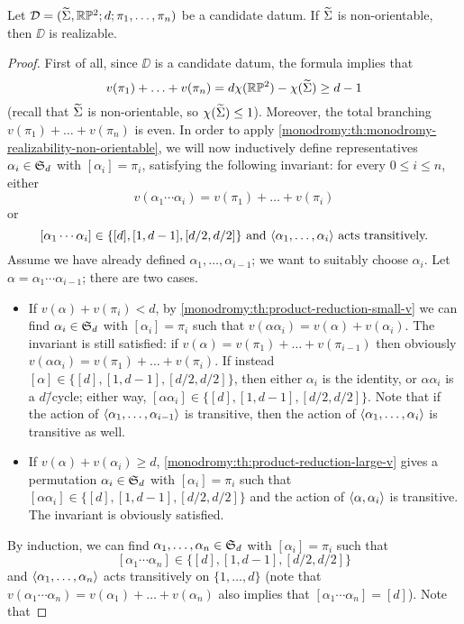 \begin{theorem}
Let $\DD=\datum{\tSigma,\RP[2]}{d}{\pi_1,\ldots,\pi_n}$ be a candidate datum. If $\widetilde{\Sigma}$ is non-orientable, then $\DD$ is realizable.
\end{theorem}
\begin{proof}
First of all, since $\DD$ is a candidate datum, the \RH{} formula implies that
\[
v(\pi_1)+\ldots+v(\pi_n)=d\chi(\RP[2])-\chi(\tSigma)\ge d-1
\]
(recall that $\widetilde{\Sigma}$ is non-orientable, so $\chi(\widetilde{\Sigma})\le 1$). Moreover, the total branching $v(\pi_1)+\ldots+v(\pi_n)$ is even. In order to apply \cref{monodromy:th:monodromy-realizability-non-orientable}, we will now inductively define representatives $\alpha_i\in\symgroup[d]$ with $[\alpha_i]=\pi_i$, satisfying the following invariant: for every $0\le i\le n$, either
\[
v(\alpha_1\cdots\alpha_i)=v(\pi_1)+\ldots+v(\pi_i)
\]
or
\[
\text{$[\alpha_1\cdots\alpha_i]\in\{[d],[1,d-1],[d/2,d/2]\}$ and $\left\langle\alpha_1,\ldots,\alpha_i\right\rangle$ acts transitively.}
\]
Assume we have already defined $\alpha_1,\ldots,\alpha_{i-1}$; we want to suitably choose $\alpha_i$. Let $\alpha=\alpha_1\cdots\alpha_{i-1}$; there are two cases.
\begin{itemize}
\item If $v(\alpha)+v(\pi_i)<d$, by \cref{monodromy:th:product-reduction-small-v} we can find $\alpha_i\in\symgroup[d]$ with $[\alpha_i]=\pi_i$ such that $v(\alpha\alpha_i)=v(\alpha)+v(\alpha_i)$. The invariant is still satisfied: if $v(\alpha)=v(\pi_1)+\ldots+v(\pi_{i-1})$ then obviously $v(\alpha\alpha_i)=v(\pi_1)+\ldots+v(\pi_i)$. If instead $[\alpha]\in\{[d],[1,d-1],[d/2,d/2]\}$, then either $\alpha_i$ is the identity, or $\alpha\alpha_i$ is a $d$\=/cycle; either way, $[\alpha\alpha_i]\in\{[d],[1,d-1],[d/2,d/2]\}$. Note that if the action of $\left\langle\alpha_1,\ldots,\alpha_{i-1}\right\rangle$ is transitive, then the action of $\left\langle\alpha_1,\ldots,\alpha_i\right\rangle$ is transitive as well.
\item If $v(\alpha)+v(\alpha_i)\ge d$, \cref{monodromy:th:product-reduction-large-v} gives a permutation $\alpha_i\in\symgroup[d]$ with $[\alpha_i]=\pi_i$ such that $[\alpha\alpha_i]\in\{[d],[1,d-1],[d/2,d/2]\}$ and the action of $\left\langle\alpha,\alpha_i\right\rangle$ is transitive. The invariant is obviously satisfied.
\end{itemize}
By induction, we can find $\alpha_1,\ldots,\alpha_n\in\symgroup[d]$ with $[\alpha_i]=\pi_i$ such that
\[
[\alpha_1\cdots\alpha_n]\in\{[d],[1,d-1],[d/2,d/2]\}
\]
and $\left\langle\alpha_1,\ldots,\alpha_n\right\rangle$ acts transitively on $\{1,\ldots,d\}$ (note that $v(\alpha_1\cdots\alpha_n)=v(\alpha_1)+\ldots+v(\alpha_n)$ also implies that $[\alpha_1\cdots\alpha_n]=[d]$). Note that

\end{proof}
